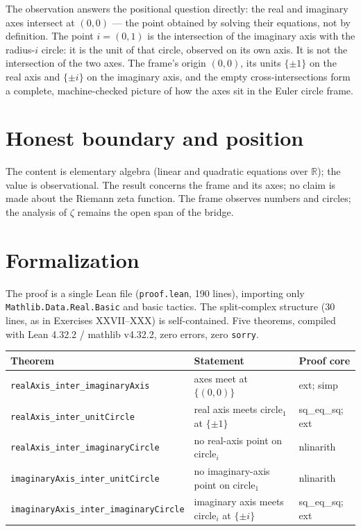 \documentclass[sigplan,10pt,anonymous,review]{acmart}
\begin{document}
The observation answers the positional question directly: the real and
imaginary axes intersect at $(0,0)$ --- the point obtained by solving
their equations, not by definition. The point $i = (0,1)$ is the
intersection of the imaginary axis with the radius-$i$ circle: it is
the unit of that circle, observed on its own axis. It is not the
intersection of the two axes. The frame's origin $(0,0)$, its units
$\{\pm 1\}$ on the real axis and $\{\pm i\}$ on the imaginary axis, and
the empty cross-intersections form a complete, machine-checked picture
of how the axes sit in the Euler circle frame.

\section{Honest boundary and position}

The content is elementary algebra (linear and quadratic equations over
$\mathbb{R}$); the value is observational. The result concerns the
frame and its axes; no claim is made about the Riemann zeta function.
The frame observes numbers and circles; the analysis of $\zeta$ remains
the open span of the bridge.

\section{Formalization}

The proof is a single Lean file (\texttt{proof.lean}, 190 lines),
importing only \texttt{Mathlib.Data.Real.Basic} and basic tactics. The
split-complex structure (30 lines, as in Exercises XXVII--XXX) is
self-contained. Five theorems, compiled with Lean 4.32.2 / mathlib
v4.32.2, zero errors, zero \texttt{sorry}.

\begin{center}
\begin{tabular}{lll}
\toprule
Theorem & Statement & Proof core \\
\midrule
\texttt{realAxis\_inter\_imaginaryAxis} & axes meet at $\{(0,0)\}$ & ext; simp \\
\texttt{realAxis\_inter\_unitCircle} & real axis meets circle$_1$ at $\{\pm 1\}$ & sq\_eq\_sq; ext \\
\texttt{realAxis\_inter\_imaginaryCircle} & no real-axis point on circle$_i$ & nlinarith \\
\texttt{imaginaryAxis\_inter\_unitCircle} & no imaginary-axis point on circle$_1$ & nlinarith \\
\texttt{imaginaryAxis\_inter\_imaginaryCircle} & imaginary axis meets circle$_i$ at $\{\pm i\}$ & sq\_eq\_sq; ext \\
\bottomrule
\end{tabular}
\end{center}
\end{document}
